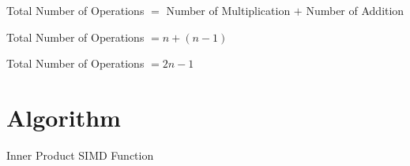 Total Number of Operations $=$ Number of Multiplication $+$ Number of Addition

Total Number of Operations $= n + (n - 1)$

Total Number of Operations $= 2n - 1$

\section{Algorithm}

\begin{algorithm}[H]
    \SetAlgoLined

    \caption{Inner Product SIMD Function}
\end{algorithm}

